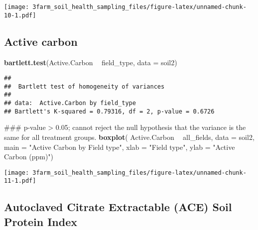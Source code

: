 \documentclass[]{article}
\newenvironment{Shaded}{\begin{snugshade}}{\end{snugshade}}
\newcommand{\KeywordTok}[1]{\textcolor[rgb]{0.13,0.29,0.53}{\textbf{#1}}}
\newcommand{\DataTypeTok}[1]{\textcolor[rgb]{0.13,0.29,0.53}{#1}}
\newcommand{\StringTok}[1]{\textcolor[rgb]{0.31,0.60,0.02}{#1}}
\newcommand{\OperatorTok}[1]{\textcolor[rgb]{0.81,0.36,0.00}{\textbf{#1}}}
\newcommand{\NormalTok}[1]{#1}
\begin{document}
\begin{Shaded}
\end{Shaded}

\texttt{[image: 3farm\_soil\_health\_sampling\_files/figure-latex/unnamed-chunk-10-1.pdf]}

\subsection{Active carbon}\label{active-carbon}

\begin{Shaded}
\begin{Highlighting}[]
\KeywordTok{bartlett.test}\NormalTok{(Active.Carbon }\OperatorTok{~}\StringTok{ }\NormalTok{field_type, }\DataTypeTok{data =}\NormalTok{ soil2)}
\end{Highlighting}
\end{Shaded}

\begin{verbatim}
## 
##  Bartlett test of homogeneity of variances
## 
## data:  Active.Carbon by field_type
## Bartlett's K-squared = 0.79316, df = 2, p-value = 0.6726
\end{verbatim}

\begin{Shaded}
\begin{Highlighting}[]
\NormalTok{### p-value > 0.05; cannot reject the null hypothesis that the variance is the same for all treatment groups.}
\KeywordTok{boxplot}\NormalTok{( Active.Carbon }\OperatorTok{~}\StringTok{ }\NormalTok{all_fields, }\DataTypeTok{data =}\NormalTok{ soil2, }\DataTypeTok{main =} \StringTok{"Active Carbon by Field type"}\NormalTok{, }\DataTypeTok{xlab =} \StringTok{"Field type"}\NormalTok{, }\DataTypeTok{ylab =} \StringTok{"Active Carbon (ppm)"}\NormalTok{)}
\end{Highlighting}
\end{Shaded}

\texttt{[image: 3farm\_soil\_health\_sampling\_files/figure-latex/unnamed-chunk-11-1.pdf]}

\subsection{Autoclaved Citrate Extractable (ACE) Soil Protein
Index}\label{autoclaved-citrate-extractable-ace-soil-protein-index}
\end{document}
